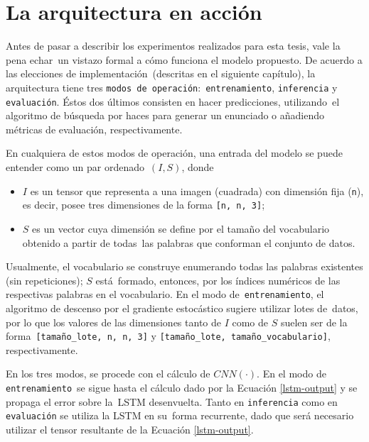 \section{La arquitectura en acción}\label{sec:arq-accion}

\noindent
Antes de pasar a describir los experimentos realizados para esta tesis, vale la pena echar\
un vistazo formal a cómo funciona el modelo propuesto. De acuerdo a las elecciones de implementación\
(descritas en el siguiente capítulo), la arquitectura tiene tres \verb+modos de operación+:\
\verb+entrenamiento+, \verb+inferencia+ y \verb+evaluación+. Éstos dos últimos consisten en hacer predicciones, utilizando\
el algoritmo de búsqueda por haces para generar un enunciado o añadiendo métricas de evaluación, respectivamente.\par
En cualquiera de estos modos de operación, una entrada del modelo se puede entender como un par ordenado\
$(I, S)$, donde
\begin{itemize}
\item $I$ es un tensor que representa a una imagen (cuadrada) con dimensión fija (\verb+n+), es decir,
  posee tres dimensiones de la forma \verb+[n, n, 3]+;
\item $S$ es un vector cuya dimensión se define por el tamaño del vocabulario obtenido a partir de todas\
  las palabras que conforman el conjunto de datos.
\end{itemize}\par
Usualmente, el vocabulario se construye enumerando todas las palabras existentes (sin repeticiones); $S$ está\
formado, entonces, por los índices numéricos de las respectivas palabras en el vocabulario. En el modo de\
\verb+entrenamiento+, el algoritmo de descenso por el gradiente estocástico sugiere utilizar lotes de\
datos, por lo que los valores de las dimensiones tanto de $I$ como de $S$ suelen ser de la forma\
\verb+[tamaño_lote, n, n, 3]+ y \verb+[tamaño_lote, tamaño_vocabulario]+, respectivamente.\par
En los tres modos, se procede con el cálculo de $CNN(\cdot)$. En el modo de \verb+entrenamiento+\
se sigue hasta el cálculo dado por la Ecuación \ref{lstm-output} y se propaga el error sobre la\
LSTM desenvuelta. Tanto en \verb+inferencia+ como en \verb+evaluación+ se utiliza la LSTM en su\
forma recurrente, dado que será necesario utilizar el tensor resultante de la Ecuación \ref{lstm-output}.

